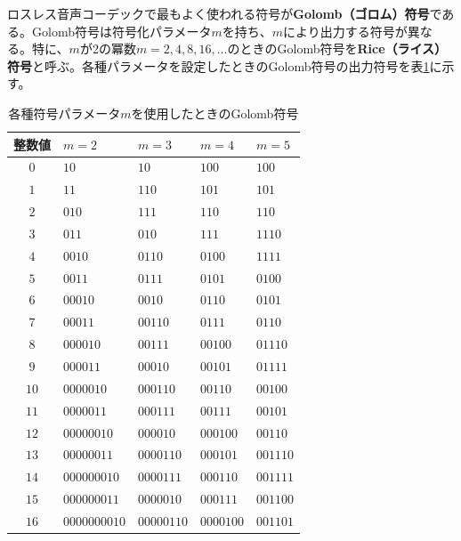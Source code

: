 \documentclass[uplatex,dvipdfmx,b5j,10pt]{jsbook}
\theoremstyle{definition}
\begin{document}
ロスレス音声コーデックで最もよく使われる符号が\textbf{Golomb（ゴロム）符号}である。Golomb符号は符号化パラメータ$m$を持ち、$m$により出力する符号が異なる。特に、$m$が2の冪数$m=2,4,8,16,\dots$のときのGolomb符号を\textbf{Rice（ライス）符号}と呼ぶ。各種パラメータを設定したときのGolomb符号の出力符号を表\ref{golomb_rice_code}に示す。
\begin{table}[htbp]
  \begin{center}
    \caption{各種符号パラメータ$m$を使用したときのGolomb符号} \label{golomb_rice_code}
    \begin{tabular}{c|l|l|l|l}
       整数値   & $m=2$        & $m=3$      & $m=4$     & $m=5$     \\ \hline
       $0$      & $10$         & $10$       & $100$     & $100$     \\
       $1$      & $11$         & $110$      & $101$     & $101$     \\
       $2$      & $010$        & $111$      & $110$     & $110$     \\
       $3$      & $011$        & $010$      & $111$     & $1110$    \\
       $4$      & $0010$       & $0110$     & $0100$    & $1111$    \\
       $5$      & $0011$       & $0111$     & $0101$    & $0100$    \\
       $6$      & $00010$      & $0010$     & $0110$    & $0101$    \\
       $7$      & $00011$      & $00110$    & $0111$    & $0110$    \\
       $8$      & $000010$     & $00111$    & $00100$   & $01110$   \\
       $9$      & $000011$     & $00010$    & $00101$   & $01111$   \\
      $10$      & $0000010$    & $000110$   & $00110$   & $00100$   \\
      $11$      & $0000011$    & $000111$   & $00111$   & $00101$   \\
      $12$      & $00000010$   & $000010$   & $000100$  & $00110$   \\
      $13$      & $00000011$   & $0000110$  & $000101$  & $001110$  \\
      $14$      & $000000010$  & $0000111$  & $000110$  & $001111$  \\
      $15$      & $000000011$  & $0000010$  & $000111$  & $001100$  \\
      $16$      & $0000000010$ & $00000110$ & $0000100$ & $001101$  \\
    \end{tabular}
  \end{center}
\end{table}
   
\end{document}
